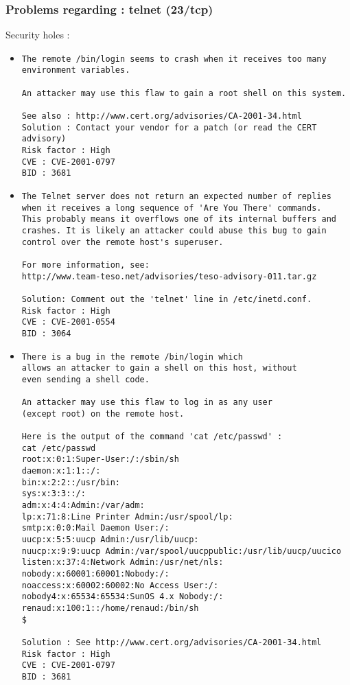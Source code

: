 \documentclass{article}
\begin{document}
\subsubsection{Problems regarding : telnet (23/tcp)}
Security holes :\\
\begin{itemize}
\item \begin{verbatim}
The remote /bin/login seems to crash when it receives too many
environment variables.

An attacker may use this flaw to gain a root shell on this system.

See also : http://www.cert.org/advisories/CA-2001-34.html
Solution : Contact your vendor for a patch (or read the CERT advisory)
Risk factor : High
CVE : CVE-2001-0797
BID : 3681
\end{verbatim}\item \begin{verbatim}
The Telnet server does not return an expected number of replies
when it receives a long sequence of 'Are You There' commands.
This probably means it overflows one of its internal buffers and
crashes. It is likely an attacker could abuse this bug to gain
control over the remote host's superuser.

For more information, see:
http://www.team-teso.net/advisories/teso-advisory-011.tar.gz

Solution: Comment out the 'telnet' line in /etc/inetd.conf.
Risk factor : High
CVE : CVE-2001-0554
BID : 3064
\end{verbatim}\item \begin{verbatim}
There is a bug in the remote /bin/login which
allows an attacker to gain a shell on this host, without
even sending a shell code. 

An attacker may use this flaw to log in as any user
(except root) on the remote host.

Here is the output of the command 'cat /etc/passwd' :
cat /etc/passwd
root:x:0:1:Super-User:/:/sbin/sh
daemon:x:1:1::/:
bin:x:2:2::/usr/bin:
sys:x:3:3::/:
adm:x:4:4:Admin:/var/adm:
lp:x:71:8:Line Printer Admin:/usr/spool/lp:
smtp:x:0:0:Mail Daemon User:/:
uucp:x:5:5:uucp Admin:/usr/lib/uucp:
nuucp:x:9:9:uucp Admin:/var/spool/uucppublic:/usr/lib/uucp/uucico
listen:x:37:4:Network Admin:/usr/net/nls:
nobody:x:60001:60001:Nobody:/:
noaccess:x:60002:60002:No Access User:/:
nobody4:x:65534:65534:SunOS 4.x Nobody:/:
renaud:x:100:1::/home/renaud:/bin/sh
$ 

Solution : See http://www.cert.org/advisories/CA-2001-34.html
Risk factor : High
CVE : CVE-2001-0797
BID : 3681
\end{verbatim}\end{itemize}
\end{document}
